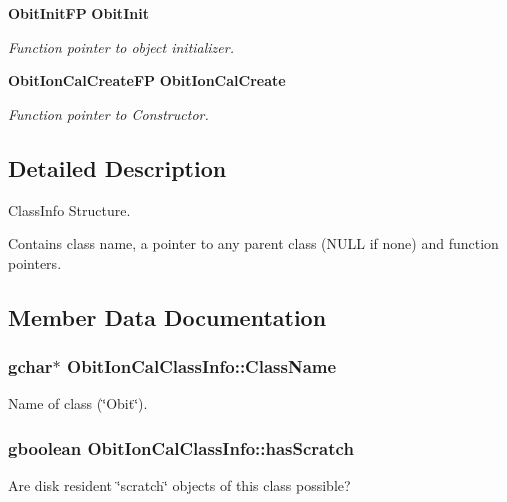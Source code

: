 \begin{CompactItemize}
{\bf Obit\-Init\-FP} {\bf Obit\-Init}
\begin{CompactList}\small\item\em Function pointer to object initializer. \item\end{CompactList}\item 
{\bf Obit\-Ion\-Cal\-Create\-FP} {\bf Obit\-Ion\-Cal\-Create}
\begin{CompactList}\small\item\em Function pointer to Constructor. \item\end{CompactList}\end{CompactItemize}


\subsection{Detailed Description}
Class\-Info Structure. 

Contains class name, a pointer to any parent class (NULL if none) and function pointers. 



\subsection{Member Data Documentation}
\subsubsection{\setlength{\rightskip}{0pt plus 5cm}gchar$\ast$ {\bf Obit\-Ion\-Cal\-Class\-Info::Class\-Name}}\label{structObitIonCalClassInfo_o2}


Name of class (\char`\"{}Obit\char`\"{}). 

\subsubsection{\setlength{\rightskip}{0pt plus 5cm}gboolean {\bf Obit\-Ion\-Cal\-Class\-Info::has\-Scratch}}\label{structObitIonCalClassInfo_o1}


Are disk resident \char`\"{}scratch\char`\"{} objects of this class possible? 

